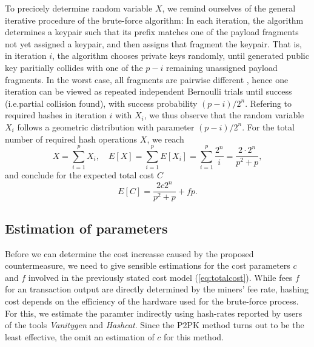 \documentclass[10pt,a4paper,twocolumn]{article}
\begin{document}
To precicely determine random variable $X$, we remind ourselves of the general iterative procedure of the brute-force algorithm:
In each iteration, the algorithm determines a keypair such that its prefix matches one of the payload fragments not yet assigned a keypair, and then assigns that fragment the keypair.
That is, in iteration $i$, the algorithm chooses private keys randomly, until generated public key paritially collides with one of the $p-i$ remaining unassigned payload fragments.
In the worst case, all fragments are pairwise different%
, hence one iteration can be viewed as repeated independent Bernoulli trials until success (i.e.\@ partial collision found), with success probability $(p-i)/2^n$.  
Refering to required hashes in iteration $i$ with $X_i$, we thus observe that the random variable $X_i$ follows a geometric distribution with parameter $(p-i)/2^n$.
For the total number of required hash operations $X$, we reach
\[ X = \sum_{i=1}^{p} X_i, \quad E[X] = \sum_{i=1}^{p} E[X_i] = \sum_{i=1}^{p}\frac{2^n}{i} = \frac{2\cdot 2^{n}}{p^2+p}, \]
and conclude for the expected total cost $C$
\begin{equation}
    E[C] = \frac{2c2^{n}}{p^2+p} + fp.\label{eq:totalcost}
\end{equation}


\subsection{Estimation of parameters}



Before we can determine the cost increasse caused by the proposed countermeasure, we need to give sensible estimations for the cost parameters $c$ and $f$ involved in the previously stated cost model (\ref{eq:totalcost}).
While fees $f$ for an transaction output are directly determined by the miners' fee rate, hashing cost depends on the efficiency of the hardware used for the brute-force process.
For this, we estimate the paramter indirectly using hash-rates reported by users of the tools \emph{Vanitygen} and \emph{Hashcat}.
Since the P2PK method turns out to be the least effective, the omit an estimation of $c$ for this method.
\end{document}
